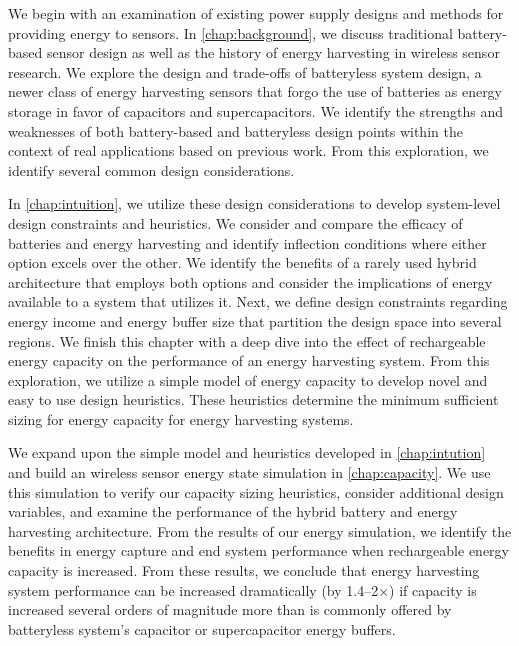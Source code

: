 We begin with an examination of existing power supply designs and methods for providing energy to sensors. In \cref{chap:background}, we discuss traditional battery-based sensor design as well as the history of energy harvesting in wireless sensor research.
We explore the design and trade-offs of batteryless system design, a newer class of energy harvesting sensors that forgo the use of batteries as energy storage in favor of capacitors and supercapacitors.
We identify the strengths and weaknesses of both battery-based and batteryless design points within the context of real applications based on previous work.
From this exploration, we identify several common design considerations.

In \cref{chap:intuition}, we utilize these design considerations to develop system-level design constraints and heuristics.
We consider and compare the efficacy of batteries and energy harvesting and identify inflection conditions where either option excels over the other. We identify the benefits of a rarely used hybrid architecture that employs both options and consider the implications of energy available to a system that utilizes it.
Next, we define design constraints regarding energy income and energy buffer size that partition the design space into several regions. 
We finish this chapter with a deep dive into the effect of rechargeable energy capacity on the performance of an energy harvesting system. From this exploration, we utilize a simple model of energy capacity to develop novel and easy to use design heuristics. These heuristics determine the minimum sufficient sizing for energy capacity for energy harvesting systems. 


We expand upon the simple model and heuristics developed in \cref{chap:intution} and build an wireless sensor energy state simulation in \cref{chap:capacity}.
We use this simulation to verify our capacity sizing heuristics, consider additional design variables, and examine the performance of the hybrid battery and energy harvesting architecture.
From the results of our energy simulation, we identify the benefits in energy capture and end system performance when rechargeable energy capacity is increased. From these results, we conclude that energy harvesting system performance can be increased dramatically (by 1.4--2$\times$) if capacity is increased several orders of magnitude more than is commonly offered by batteryless system's capacitor or supercapacitor energy buffers. 

